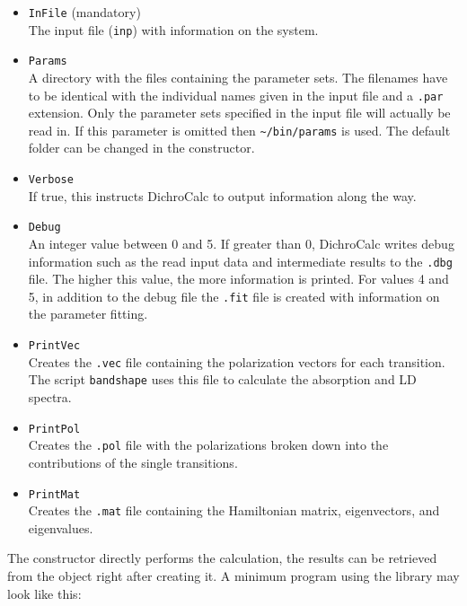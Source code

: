 \documentclass[11pt, letterpaper]{article}
\begin{document}
\begin{itemize}
\item \verb'InFile' (mandatory) \\
The input file (\verb'inp') with information on the system.

\item \verb'Params' \\
A directory with the files containing the parameter sets. The filenames have to be identical with the individual names given in the input file and a \verb'.par' extension. Only the parameter sets specified in the input file will actually be read in. If this parameter is omitted then \verb'~/bin/params' is used. The default folder can be changed in the constructor.

\item \verb'Verbose' \\
If true, this instructs DichroCalc to output information along the way.

\item \verb'Debug' \\
An integer value between 0 and 5. If greater than 0, DichroCalc writes debug information such as the read input data and intermediate results to the \verb'.dbg' file. The higher this value, the more information is printed. For values 4 and 5, in addition to the debug file the \verb'.fit' file is created with information on the parameter fitting.

\item \verb'PrintVec' \\
Creates the \verb'.vec' file containing the polarization vectors for each transition. The script \verb'bandshape' uses this file to calculate the absorption and LD spectra.

\item \verb'PrintPol' \\
Creates the \verb'.pol' file with the polarizations broken down into the contributions of the single transitions.

\item \verb'PrintMat' \\
Creates the \verb'.mat' file containing the Hamiltonian matrix, eigenvectors, and eigenvalues.

\end{itemize}

\newpage

The constructor directly performs the calculation, the results can be retrieved from the object right after creating it. A minimum program using the library may look like this:
\end{document}
